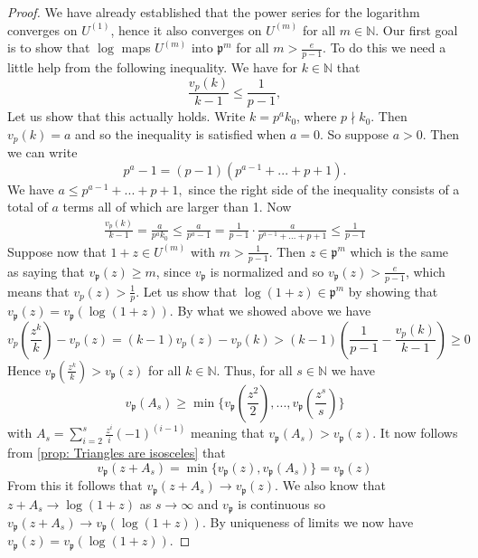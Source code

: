 \documentclass{article}
\newcommand{\mfrak}[1]{\mathfrak{#1}}
\newcommand{\mbb}[1]{\mathbb{#1}}
\newcommand{\vp}{{v_{\mfrak p}}}
\begin{document}
\begin{proof}
    We have already established that the power series for the logarithm converges on $U^{(1)}$, hence it also converges on $U^{(m)}$ for all $m \in \mbb N$. Our first goal is to show that $\log$ maps $U^{(m)}$ into $\mfrak p^{m}$ for all $m > \frac{e}{p-1}$. To do this we need a little help from the following inequality. We have for $k \in \mbb N$ that
    $$\frac{v_p(k)}{k-1} \leq \frac{1}{p-1},$$
    Let us show that this actually holds. Write $k = p^ak_0$, where $p \nmid k_0$. Then $v_p(k) = a$ and so the inequality is satisfied when $a = 0$. So suppose $a > 0$. Then we can write 
    $$p^a - 1 = (p-1)(p^{a-1} + ... + p + 1).$$
    We have
    $a \leq p^{a-1} + ... + p + 1,$
    since the right side of the inequality consists of a total of $a$ terms all of which are larger than 1. Now
    \begin{align*}
        \frac{v_p(k)}{k-1} = \frac{a}{p^ak_0} \leq \frac{a}{p^a - 1} = \frac{1}{p-1}\cdot \frac{a}{p^{a-1} + ... + p + 1} \leq \frac{1}{p-1}
    \end{align*}  
    Suppose now that $1+z \in U^{(m)}$ with $ m > \frac{1}{p-1}$. Then $z \in \mfrak p^m$ which is the same as saying that $\vp (z) \geq m$, since $\vp$ is normalized and so $\vp(z) > \frac{e}{p-1}$, which means that $v_p(z) > \frac{1}{p}$. Let us show that $\log(1+z) \in \mfrak p^m$ by showing that $\vp(z) = \vp(\log(1+ z))$. By what we showed above we have
    $$v_p(\frac{z^k}{k}) - v_p(z) = (k-1)v_p(z) - v_p(k) > (k-1)(\frac{1}{p-1} - \frac{v_p(k)}{k-1}) \geq 0$$  
    Hence $\vp(\frac{z^k}{k}) > \vp(z)$ for all $k \in \mbb N$. Thus, for all $s \in \mbb N$ we have $$\vp(A_s) \geq \min \{\vp(\frac{z^2}{2}), ..., \vp(\frac{z^s}{s}) \}$$ 
    with $A_s = \sum_{i = 2}^s \frac{z^i}{i} (-1)^{(i-1)}$ meaning that $\vp(A_s) > \vp(z)$. It now follows from \cref{prop: Triangles are isosceles} that 
    $$\vp(z + A_s) = \min\{\vp(z), \vp(A_s)\} = \vp(z)$$
    From this it follows that $\vp(z + A_s) \to \vp(z)$. We also know that $z + A_s \to \log(1 + z)$ as $s \to \infty$ and $\vp$ is continuous so $\vp(z + A_s) \to \vp(\log(1 + z))$. By uniqueness of limits we now have $\vp(z) = \vp(\log(1+z))$. 
    

\end{proof}
\end{document}
